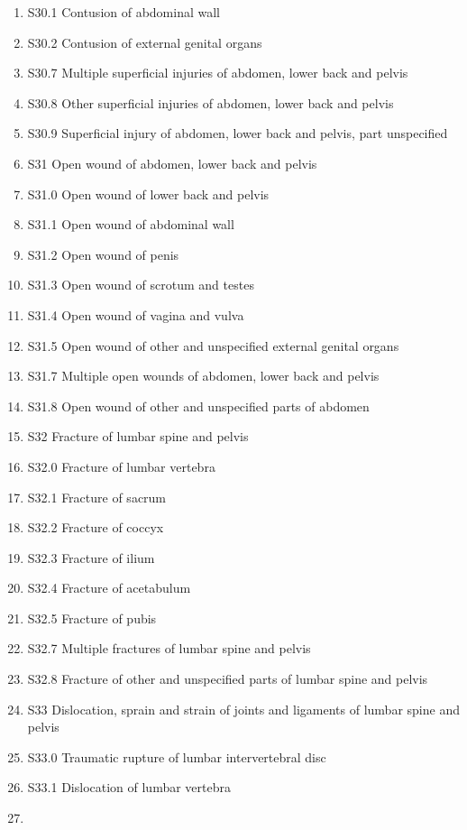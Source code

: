 \documentclass[
]{scrartcl}
\begin{document}
\begin{itemize}
\begin{enumerate}
  \item
    S30.1 Contusion of abdominal wall
  \item
    S30.2 Contusion of external genital organs
  \item
    S30.7 Multiple superficial injuries of abdomen, lower back and
    pelvis
  \item
    S30.8 Other superficial injuries of abdomen, lower back and pelvis
  \item
    S30.9 Superficial injury of abdomen, lower back and pelvis, part
    unspecified
  \item
    S31 Open wound of abdomen, lower back and pelvis
  \item
    S31.0 Open wound of lower back and pelvis
  \item
    S31.1 Open wound of abdominal wall
  \item
    S31.2 Open wound of penis
  \item
    S31.3 Open wound of scrotum and testes
  \item
    S31.4 Open wound of vagina and vulva
  \item
    S31.5 Open wound of other and unspecified external genital organs
  \item
    S31.7 Multiple open wounds of abdomen, lower back and pelvis
  \item
    S31.8 Open wound of other and unspecified parts of abdomen
  \item
    S32 Fracture of lumbar spine and pelvis
  \item
    S32.0 Fracture of lumbar vertebra
  \item
    S32.1 Fracture of sacrum
  \item
    S32.2 Fracture of coccyx
  \item
    S32.3 Fracture of ilium
  \item
    S32.4 Fracture of acetabulum
  \item
    S32.5 Fracture of pubis
  \item
    S32.7 Multiple fractures of lumbar spine and pelvis
  \item
    S32.8 Fracture of other and unspecified parts of lumbar spine and
    pelvis
  \item
    S33 Dislocation, sprain and strain of joints and ligaments of lumbar
    spine and pelvis
  \item
    S33.0 Traumatic rupture of lumbar intervertebral disc
  \item
    S33.1 Dislocation of lumbar vertebra
  \item

\end{enumerate}
\end{itemize}
\end{document}
